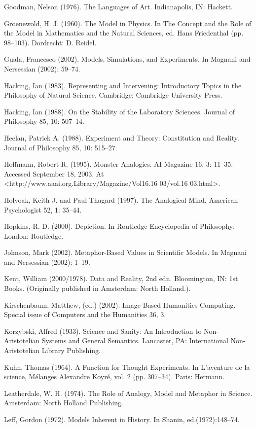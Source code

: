 Goodman, Nelson (1976). The Languages of Art. Indianapolis, IN: Hackett.

Groenewold, H. J. (1960). The Model in Physics. In The Concept and the Role of the Model in Mathematics and the Natural Sciences, ed. Hans Friedenthal (pp. 98–103). Dordrecht: D. Reidel.

Guala, Francesco (2002). Models, Simulations, and Experiments. In Magnani and Nersessian (2002): 59–74.

Hacking, Ian (1983). Representing and Intervening: Introductory Topics in the Philosophy of Natural Science. Cambridge: Cambridge University Press.

Hacking, Ian (1988). On the Stability of the Laboratory Sciences. Journal of Philosophy 85, 10: 507–14.

Heelan, Patrick A. (1988). Experiment and Theory: Constitution and Reality. Journal of Philosophy 85, 10: 515–27.

Hoffmann, Robert R. (1995). Monster Analogies. AI Magazine 16, 3: 11–35. Accessed September 18, 2003. At <http://www.aaai.org.Library/Magazine/Vol16.16 03/vol.16 03.html>.

Holyoak, Keith J. and Paul Thagard (1997). The Analogical Mind. American Psychologist 52, 1: 35–44.

Hopkins, R. D. (2000). Depiction. In Routledge Encyclopedia of Philosophy. London: Routledge.

Johnson, Mark (2002). Metaphor-Based Values in Scientific Models. In Magnani and Nersessian (2002): 1–19.

Kent, William (2000/1978). Data and Reality, 2nd edn. Bloomington, IN: 1st Books. (Originally published in Amsterdam: North Holland.).

Kirschenbaum, Matthew, (ed.) (2002). Image-Based Humanities Computing. Special issue of Computers and the Humanities 36, 3.

Korzybski, Alfred (1933). Science and Sanity: An Introduction to Non-Aristotelian Systems and General Semantics. Lancaster, PA: International Non-Aristotelian Library Publishing.

Kuhn, Thomas (1964). A Function for Thought Experiments. In L'aventure de la science, Mélanges Alexandre Koyré, vol. 2 (pp. 307–34). Paris: Hermann.

Leatherdale, W. H. (1974). The Role of Analogy, Model and Metaphor in Science. Amsterdam: North Holland Publishing.

Leff, Gordon (1972). Models Inherent in History. In Shanin, ed.(1972):148–74.

